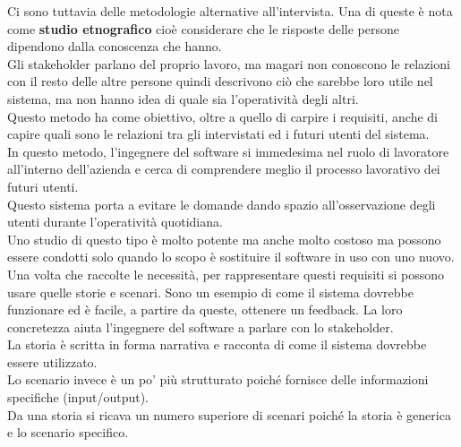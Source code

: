 Ci sono tuttavia delle metodologie alternative all'intervista.
Una di queste è nota come \textbf{studio etnografico} cioè considerare che le risposte delle persone dipendono dalla conoscenza che hanno.\\
Gli stakeholder parlano del proprio lavoro, ma magari non conoscono le relazioni con il resto delle altre persone quindi descrivono ciò che sarebbe loro utile nel sistema, ma non hanno idea di quale sia l'operatività degli altri.\\
Questo metodo ha come obiettivo, oltre a quello di carpire i requisiti, anche di capire quali sono le relazioni tra gli intervistati ed i futuri utenti del sistema.\\
In questo metodo, l'ingegnere del software si immedesima nel ruolo di lavoratore all'interno dell'azienda e cerca di comprendere meglio il processo lavorativo dei futuri utenti.\\
Questo sistema porta a evitare le domande dando spazio all'osservazione degli utenti durante l'operatività quotidiana.\\
Uno studio di questo tipo è molto potente ma anche molto costoso ma possono essere condotti solo quando lo scopo è sostituire il software in uso con uno nuovo.\\
Una volta che raccolte le necessità, per rappresentare questi requisiti si possono usare quelle storie e scenari.
Sono un esempio di come il sistema dovrebbe funzionare ed è facile, a partire da queste, ottenere un feedback.
La loro concretezza aiuta l'ingegnere del software a parlare con lo stakeholder.\\
La storia è scritta in forma narrativa e racconta di come il sistema dovrebbe essere utilizzato.\\
Lo scenario invece è un po' più strutturato poiché fornisce delle informazioni specifiche (input/output).\\
Da una storia si ricava un numero superiore di scenari poiché la storia è generica e lo scenario specifico.


